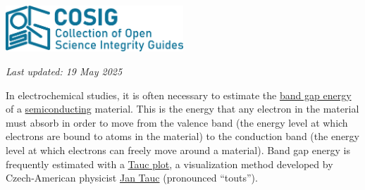 \documentclass[letterpaper, 12pt]{article}
\begin{document}
\flushleft\includegraphics[width=0.5\textwidth]{img/home/241017_final_logo_mockup.png}

\textit{Last updated: 19 May 2025}

In electrochemical studies, it is often necessary to estimate the \href{https://en.wikipedia.org/wiki/Band_gap}{band gap energy} of a \href{https://en.wikipedia.org/wiki/Semiconductor}{semiconducting} material. This is the energy that any electron in the material must absorb in order to move from the valence band (the energy level at which electrons are bound to atoms in the material) to the conduction band (the energy level at which electrons can freely move around a material). Band gap energy is frequently estimated with a \href{https://en.wikipedia.org/wiki/Tauc_plot}{Tauc plot}, a visualization method developed by Czech-American physicist \href{https://en.wikipedia.org/wiki/Jan_Tauc}{Jan Tauc} (pronounced  ``touts'').
\end{document}
